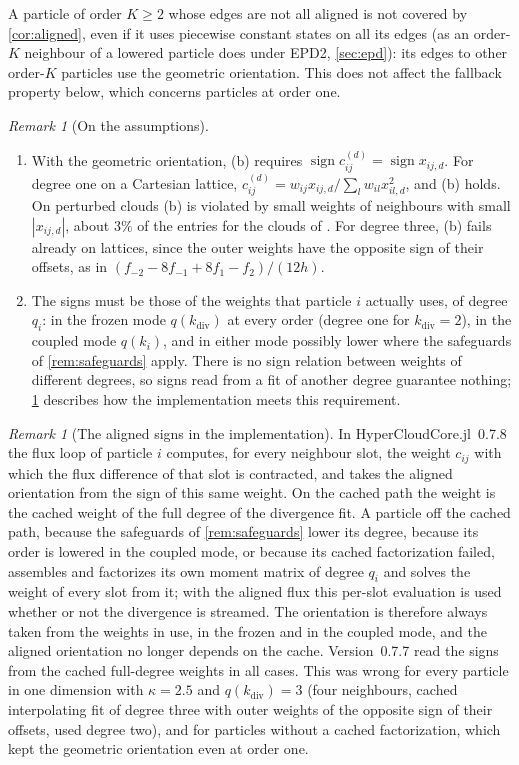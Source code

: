 \documentclass[11pt,a4paper]{article}
\theoremstyle{plain}
\theoremstyle{definition}
\theoremstyle{remark}
\newtheorem{remark}[theorem]{Remark}
\numberwithin{equation}{section}
\newcommand{\sgn}{\operatorname{sign}}
\newcommand{\qdiv}{q}
\begin{document}
A particle of order $K\ge2$ whose edges are not all aligned is not covered by \cref{cor:aligned}, even if it uses piecewise constant states on all its edges (as an order-$K$ neighbour of a lowered particle does under EPD2, \cref{sec:epd}): its edges to other order-$K$ particles use the geometric orientation. This does not affect the fallback property below, which concerns particles at order one.

\begin{remark}[On the assumptions]\label{rem:positivity}
\begin{enumerate}[label=(\roman*)]
\item With the geometric orientation, (b) requires $\sgn c^{(d)}_{ij}=\sgn x_{ij,d}$. For degree one on a Cartesian lattice, $c^{(d)}_{ij}=w_{ij}x_{ij,d}/\sum_lw_{il}x_{il,d}^2$, and (b) holds. On perturbed clouds (b) is violated by small weights of neighbours with small $|x_{ij,d}|$, about $3\%$ of the entries for the clouds of \cite{JungMUSCL2026}. For degree three, (b) fails already on lattices, since the outer weights have the opposite sign of their offsets, as in $(f_{-2}-8f_{-1}+8f_1-f_2)/(12h)$.
\item The signs must be those of the weights that particle $i$ actually uses, of degree $q_i$: in the frozen mode $\qdiv(k_{\mathrm{div}})$ at every order (degree one for $k_{\mathrm{div}}=2$), in the coupled mode $\qdiv(k_i)$, and in either mode possibly lower where the safeguards of \cref{rem:safeguards} apply. There is no sign relation between weights of different degrees, so signs read from a fit of another degree guarantee nothing; \cref{rem:signs} describes how the implementation meets this requirement.
\end{enumerate}
\end{remark}

\begin{remark}[The aligned signs in the implementation]\label{rem:signs}
In HyperCloudCore.jl~0.7.8 the flux loop of particle $i$ computes, for every neighbour slot, the weight $c_{ij}$ with which the flux difference of that slot is contracted, and takes the aligned orientation from the sign of this same weight. On the cached path the weight is the cached weight of the full degree of the divergence fit. A particle off the cached path, because the safeguards of \cref{rem:safeguards} lower its degree, because its order is lowered in the coupled mode, or because its cached factorization failed, assembles and factorizes its own moment matrix of degree $q_i$ and solves the weight of every slot from it; with the aligned flux this per-slot evaluation is used whether or not the divergence is streamed. The orientation is therefore always taken from the weights in use, in the frozen and in the coupled mode, and the aligned orientation no longer depends on the cache. Version~0.7.7 read the signs from the cached full-degree weights in all cases. This was wrong for every particle in one dimension with $\kappa=2.5$ and $\qdiv(k_{\mathrm{div}})=3$ (four neighbours, cached interpolating fit of degree three with outer weights of the opposite sign of their offsets, used degree two), and for particles without a cached factorization, which kept the geometric orientation even at order one.
\end{remark}
\end{document}
